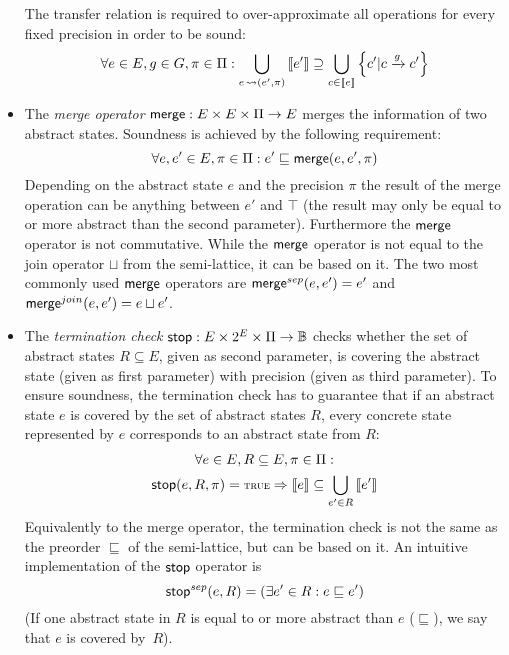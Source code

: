 \begin{itemize}
  The transfer relation is required to over-approximate all operations for every fixed precision in order to be sound: 
  \begin{displaymath}
  \forall e \in E, g \in G, \pi \in \Pi: \bigcup_{e \operatorname{\leadsto} (e', \pi)} \left\llbracket e' \right\rrbracket \supseteq \bigcup_{c \in \left\llbracket e \right\rrbracket} \left\{c' | c \xrightarrow{g} c'\right\}
  \end{displaymath}

 \item The \emph{merge operator} $\operatorname{\mathsf{merge}} : E \times E \times \Pi \rightarrow E$ merges the information of two abstract states. Soundness is achieved by the following requirement:
 \begin{displaymath}
  \forall e, e' \in E, \pi \in \Pi: e' \sqsubseteq \operatorname{\mathsf{merge}}(e, e', \pi)
 \end{displaymath}
 Depending on the abstract state $e$ and the precision $\pi$ the result of the merge operation can be anything between $e'$ and $\top$ (the result may only be equal to or more abstract than the second parameter). Furthermore the $\operatorname{\mathsf{merge}}$ operator is not commutative. While the $\operatorname{\mathsf{merge}}$ operator is not equal to the join operator $\sqcup$ from the semi-lattice, it can be based on it.
 The two most commonly used $\operatorname{\mathsf{merge}}$ operators are $\operatorname{\mathsf{merge}}^{sep}(e,e') = e'$ and $\operatorname{\mathsf{merge}}^{join}(e,e') = e \sqcup e'$.

 \item The \emph{termination check} $\operatorname{\mathsf{stop}} : E \times 2^E \times \Pi \rightarrow \mathbb{B}$ checks whether the set of abstract states $R \subseteq E$, given as second parameter, is covering the abstract state (given as first parameter) with precision (given as third parameter). To ensure soundness, the termination check has to guarantee that if an abstract state $e$ is covered by the set of abstract states $R$, every concrete state represented by $e$ corresponds to an abstract state from $R$:
 \begin{gather*}
   \forall e \in E, R \subseteq E, \pi \in \precision:\\
   \stopop(e, R, \pi) = \text{\true{}} \Rightarrow \sem{e} \subseteq \bigcup_{e' \in R} \sem{e'}
 \end{gather*}
Equivalently to the merge operator, the termination check is not the same as the preorder $\sqsubseteq$ of the semi-lattice, but can be based on it. An intuitive implementation of the $\operatorname{\mathsf{stop}}$ operator is   \begin{displaymath}\operatorname{\mathsf{stop}}^{sep}(e, R) = (\exists e' \in R: e \sqsubseteq e')  \end{displaymath} (If one abstract state in $R$ is equal to or more abstract than $e$ ($\sqsubseteq$), we say that $e$ is covered by~$R$).



\end{itemize}
